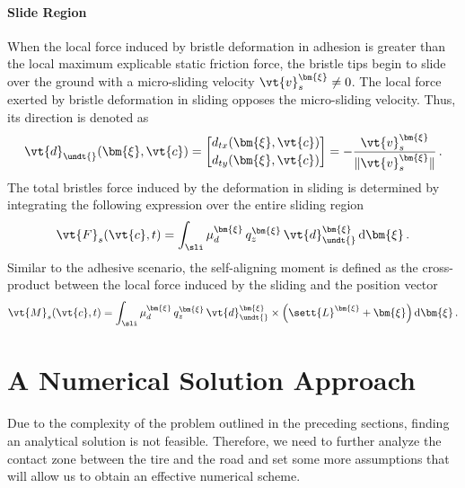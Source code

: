 \paragraph{Slide Region}

When the local force induced by bristle deformation in adhesion is greater than the local maximum explicable static friction force, the bristle tips begin to slide over the ground with a micro-sliding velocity $\vt{v}_s^{\bm{\xi}} \neq 0$. The local force exerted by bristle deformation in sliding opposes the micro-sliding velocity. Thus, its direction is denoted as
%
\begin{equation}
  \vt{d}_{\undt{}
}(\bm{\xi},\vt{c}) =
  \begin{bmatrix}
    d_{tx}(\bm{\xi},\vt{c}) \\[0.2em]
    d_{ty}(\bm{\xi},\vt{c})
  \end{bmatrix} =
  -\dfrac{\vt{v}_s^{\bm{\xi}}}{\|{\vt{v}_s^{\bm{\xi}}}\|} \, \text{.}
\end{equation}
%
The total bristles force induced by the deformation in sliding is determined by integrating the following expression over the entire sliding region \sli{}
%
\begin{equation}
  \vt{F}_s(\vt{c},t) = \int_{\sli} \mu_d^{\bm{\xi}}\,q_z^{\bm{\xi}}\,\vt{d}_{\undt{}
}^{\bm{\xi}} \, \mathrm{d}\bm{\xi} \, \text{.}
  \label{app3:eq:F_s}
\end{equation}
%
Similar to the adhesive scenario, the self-aligning moment is defined as the cross-product between the local force induced by the sliding and the position vector
%
\begin{equation}
  \vt{M}_s(\vt{c},t) = \int_{\sli} \mu_d^{\bm{\xi}}\,q_z^{\bm{\xi}}\,\vt{d}_{\undt{}
}^{\bm{\xi}} \times \left(\sett{L}^{\bm{\xi}} + \bm{\xi}\right) \mathrm{d}\bm{\xi} \, \text{.}
  \label{app3:eq:M_s}
\end{equation}


\section{A Numerical Solution Approach}
\label{app3:sec:numerical_solution}

Due to the complexity of the problem outlined in the preceding sections, finding an analytical solution is not feasible. Therefore, we need to further analyze the contact zone between the tire and the road and set some more assumptions that will allow us to obtain an effective numerical scheme.

